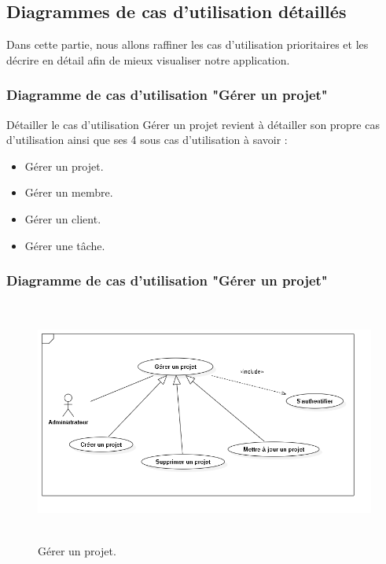 



\subsection{ Diagrammes de cas d'utilisation d\'{e}taill\'{e}s }


Dans cette partie, nous allons raffiner les cas d’utilisation prioritaires et les
décrire en détail afin de mieux visualiser notre application.



\subsubsection{ Diagramme de cas d'utilisation "G\'{e}rer un projet"}
D\'{e}tailler le cas d'utilisation \guillemotleft{}G\'{e}rer un projet \guillemotright{} revient \`{a} d\'{e}tailler son propre
cas d'utilisation ainsi que ses 4 sous cas d'utilisation \`{a} savoir :

\begin{itemize}
\item{ G\'{e}rer un projet.}
\item{ G\'{e}rer  un membre.}
\item{ G\'{e}rer un client.}
\item{ G\'{e}rer  une t\^{a}che.}
\end{itemize}

\subsubsection{ Diagramme de cas d'utilisation "G\'{e}rer un projet"}

\begin{figure}[H]
\center
\includegraphics[width=13cm,height=8cm]{./figures/ucP.png}
\caption{G\'{e}rer un projet.}

\end{figure}



